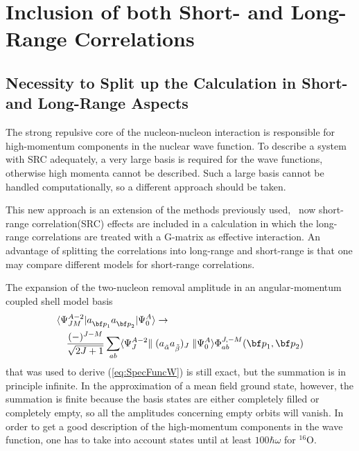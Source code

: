 \section{Inclusion of both Short- and Long-Range Correlations}
\subsection{Necessity to Split up the Calculation in Short- and Long-Range 
Aspects\label{sec:splitting}}

The strong repulsive
core of the nucleon-nucleon interaction is responsible for high-momentum 
components in the nuclear wave function. To describe a system with SRC 
adequately, a very large basis is required for the wave functions, otherwise
high momenta cannot be described.
Such a large basis cannot be handled computationally, so a different approach
should be taken. 

This new approach is an extension of the methods previously 
used\cite{Br90,Rij93}, \viz\ now short-range correlation(SRC) effects are 
included
in a calculation in which the long-range correlations are treated with a 
G-matrix as effective interaction.
An advantage of splitting the correlations into long-range and 
short-range is that one may compare 
different models for short-range correlations.

The expansion of the two-nucleon removal amplitude in an angular-momentum 
coupled shell model basis 
%
	\begin{eqnarray}
	\lefteqn{%
		\ME< \Psi^{A-2}_{J M}| \Oa{\rvec{p}_1} \Oa{\rvec{p}_2} %
		| \Psi^A_0 >
	\rightarrow} \nonumber \\
	&&
		\frac{(-)^{J-M}}
		     {\sqrt{2J+1}}
		\sum_{ab}
		\RME< \Psi^{A-2}_{J}| 
		(\Oa{\tilde{\alpha}} \Oa{\tilde{\beta}})_J %
		| \Psi^A_0 >
		\Phi_{ab}^{J, -M}(\rvec{p}_1, \rvec{p}_2)
	\label{eq:MEaa}
	\end{eqnarray}
%
that was used to derive (\ref{eq:SpecFuncW})
is still exact, but the summation is in principle infinite. 
In the 
approximation of a mean field ground state, however, the summation is finite
because
the basis states are either completely filled or completely empty, so
all the amplitudes concerning empty orbits will vanish. 
In order to
get a good description of the high-momentum components in the wave function,
one has to take into account states until at least $100\hbar\omega$ for
$^{16}$O\cite{MS93}.

